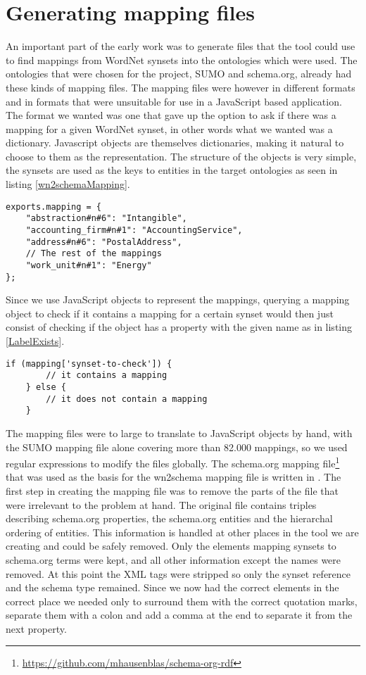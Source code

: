 \section{Generating mapping files}
An important part of the early work was to generate files that the tool could use to find mappings from WordNet synsets
into the ontologies which were used.
The ontologies that were chosen for the project, SUMO  and schema.org, already had these kinds of mapping files.
The mapping files were however in different formats and in formats that were unsuitable for use in a JavaScript based application.
The format we wanted was one that gave up the option to ask if there was a mapping for a given WordNet synset,
in other words what we wanted was a dictionary.
Javascript objects are themselves dictionaries, making it natural to choose to them as the representation.
The structure of the objects is very simple,
the synsets are used as the keys to entities in the target ontologies as seen in listing \ref{wn2schemaMapping}.

\begin{lstlisting}[label=wn2schemaMapping, caption={Excerpt from the \href{https://github.com/EivindEE/Madame/blob/master/mappings/wn2schema.js}{wn2schema.js} mapping file}]
exports.mapping = {
	"abstraction#n#6": "Intangible",
	"accounting_firm#n#1": "AccountingService",
	"address#n#6": "PostalAddress",
	// The rest of the mappings
	"work_unit#n#1": "Energy"
};
\end{lstlisting}

Since we use JavaScript objects to represent the mappings,
querying a mapping object to check if it contains a mapping for a certain synset would then just consist of checking if
the object has a property with the given name as in listing \ref{LabelExists}.
\begin{lstlisting}[label=LabelExists,caption=Testing if a mapping exists]
	if (mapping['synset-to-check']) {
		// it contains a mapping
	} else {
		// it does not contain a mapping
	}
\end{lstlisting}

The mapping files were to large to translate to JavaScript objects by hand, with the SUMO mapping file alone
covering more than 82.000 mappings, so we used regular expressions to modify the files globally.
The schema.org mapping file\footnote{\url{https://github.com/mhausenblas/schema-org-rdf}}
that was used as the basis for the wn2schema mapping file is written in .
The first step in creating the mapping file was to remove the parts of the file that were irrelevant to the problem at hand.
The original file contains triples describing schema.org properties,
the schema.org entities and the hierarchal ordering of entities.
This information is handled at other places in the tool we are creating and could be safely removed.
Only the elements mapping synsets to schema.org terms were kept, and all other information except the names were removed.
At this point the XML tags were stripped so only the synset reference and the schema type remained.
Since we now had the correct elements in the correct place we needed only to surround them with the correct quotation
marks, separate them with a colon and add a comma at the end to separate it from the next property.

